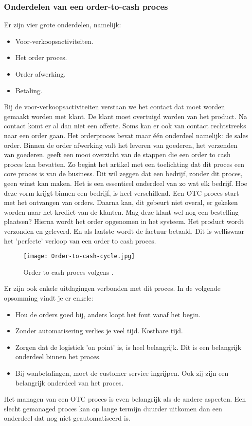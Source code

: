 \subsubsection{Onderdelen van een order-to-cash proces}
Er zijn vier grote onderdelen, namelijk:
\begin{itemize}
	\item Voor-verkoopsactiviteiten.
	\item Het order proces.
	\item Order afwerking.
	\item Betaling.
\end{itemize}
Bij de voor-verkoopsactiviteiten verstaan we het contact dat moet worden gemaakt worden met klant. De klant moet overtuigd worden van het product. Na contact komt er al dan niet een offerte. Soms kan er ook van contact rechtstreeks naar een order gaan. 
Het orderproces bevat maar één onderdeel namelijk: de sales order. 
Binnen de order afwerking valt het leveren van goederen, het verzenden van goederen.
\textcite{Kumaran2015} geeft een mooi overzicht van de stappen die een order to cash proces kan bevatten. Zo begint het artikel met een toelichting dat dit proces een core proces is van de business. Dit wil zeggen dat een bedrijf, zonder dit proces, geen winst kan maken. Het is een essentieel onderdeel van zo wat elk bedrijf. Hoe deze vorm krijgt binnen een bedrijf, is heel verschillend. Een OTC proces start met het ontvangen van orders. Daarna kan, dit gebeurt niet overal, er gekeken worden naar het krediet van de klanten. Mag deze klant wel nog een bestelling plaatsen? Hierna wordt het order opgenomen in het systeem. Het product wordt verzonden en geleverd. En als laatste wordt de factuur betaald. Dit is welliswaar het 'perfecte' verloop van een order to cash proces. 
\begin{figure}[h]
	\texttt{[image: Order-to-cash-cycle.jpg]}
	\caption{Order-to-cash proces volgens \textcite{Kumaran2015}.}
	\centering
\end{figure}
Er zijn ook enkele uitdagingen verbonden met dit proces. In de volgende opsomming vindt je er enkele:
\begin{itemize}
	\item Hou de orders goed bij, anders loopt het fout vanaf het begin. 
	\item Zonder automatisering verlies je veel tijd. Kostbare tijd.
	\item Zorgen dat de logistiek 'on point' is, is heel belangrijk. Dit is een belangrijk onderdeel binnen het proces.
	\item Bij wanbetalingen, moet de customer service ingrijpen. Ook zij zijn een belangrijk onderdeel van het proces.
\end{itemize}
Het managen van een OTC proces is even belangrijk als de andere aspecten. Een slecht gemanaged proces kan op lange termijn duurder uitkomen dan een onderdeel dat nog niet geautomatiseerd is. 
